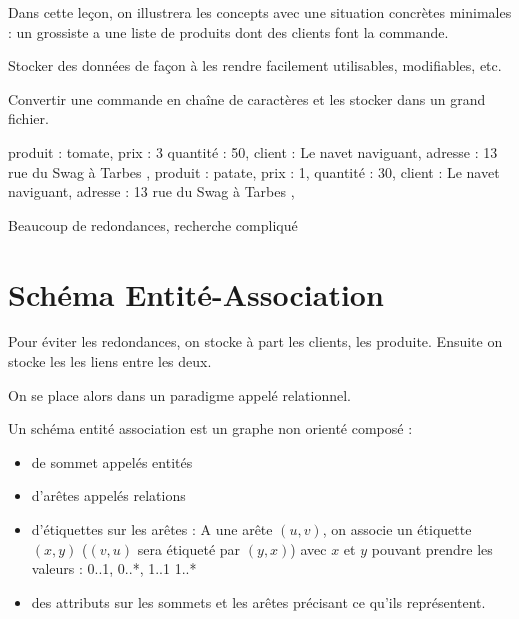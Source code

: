 
Dans cette leçon, on illustrera les concepts avec une situation concrètes minimales : un grossiste a une liste de produits dont des clients font la commande.

\begin{personalise}[Objectif]
	Stocker des données de façon à les rendre facilement utilisables, modifiables, etc.
\end{personalise}

\begin{personalise}
	Convertir une commande en chaîne de caractères et les stocker dans un grand fichier.
\end{personalise}

\begin{example}
	{ produit : tomate, prix : 3 quantité : 50, client : Le navet naviguant, adresse : 13 rue du Swag à Tarbes },  { produit : patate, prix : 1, quantité : 30, client : Le navet naviguant, adresse : 13 rue du Swag à Tarbes },
\end{example}

\begin{personalise}[Problème]
	Beaucoup de redondances, recherche compliqué
\end{personalise}

\section{Schéma Entité-Association}

\begin{idee}
	Pour éviter les redondances, on stocke à part les clients, les produite. Ensuite on stocke les les liens entre les deux.
\end{idee}

On se place alors dans un paradigme appelé relationnel.

\begin{definition}
	Un schéma entité association est un graphe non orienté composé :
	\begin{itemize}[label=$\star$]
		\item de sommet appelés entités
		\item d'arêtes appelés relations
		\item d'étiquettes sur les arêtes : A une arête $(u,v)$, on associe un étiquette $(x,y)$ ($(v,u)$ sera étiqueté par $(y,x)$) avec $x$ et $y$ pouvant prendre les valeurs : 0..1, 0..*, 1..1 1..*
		\item des attributs sur les sommets et les arêtes précisant ce qu'ils représentent.
	\end{itemize}
\end{definition}

